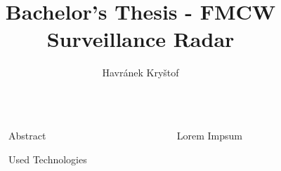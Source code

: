 \documentclass[final]{beamer}
\title{Bachelor's Thesis - FMCW Surveillance Radar}
\author{Havránek Kryštof}
\institute[shortinst]{Czech Technical University in Prague}
\newlength{\sepwidth}
\newlength{\colwidth}
\newcommand{\separatorcolumn}{\begin{column}{\sepwidth}\end{column}}
\begin{document}
\begin{frame}[t]
  \begin{columns}[t]
    \separatorcolumn

    \begin{column}{\colwidth}

      \begin{block}{Abstract}


      \end{block}

      \begin{block}{Used Technologies}




      \end{block}



    \end{column}

    \separatorcolumn

    \begin{column}{\colwidth}
      \begin{block}{Lorem Impsum}

      \end{block}


    \end{column}

    \separatorcolumn
  \end{columns}
\end{frame}
\end{document}
